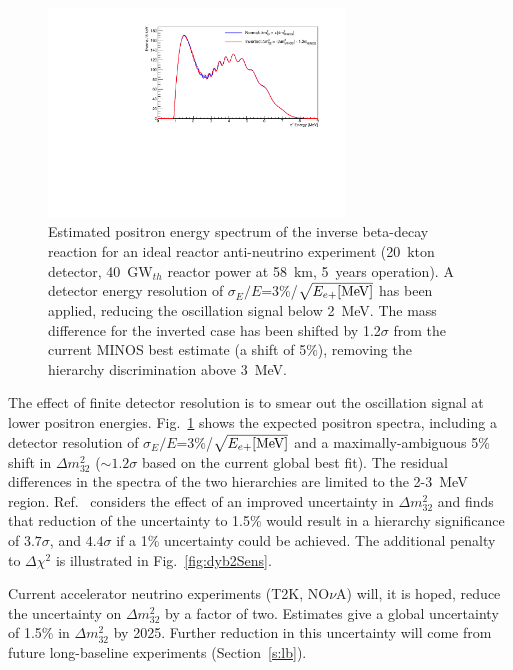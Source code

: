 \begin{figure}[htb]
\centering
\includegraphics[width=0.7\textwidth]{DAD/positronSpectrumWithResolution_deltaMSq32.pdf}
\caption{Estimated positron energy spectrum of the inverse beta-decay reaction 
  for an ideal reactor anti-neutrino experiment (20~kton
  detector, 40~GW$_{th}$ reactor power at 58~km, 5~years operation).
  A detector energy resolution of
  $\sigma_{E}/E$=3\%/$\sqrt{E_{e+}{\rm [MeV]}}$ has been applied,
  reducing the oscillation signal below 2~MeV.  The mass difference
  for the inverted case has been shifted by 1.2$\sigma$ from the current MINOS
  best estimate (a shift of 5\%), removing the hierarchy discrimination above 3~MeV.
 }
\label{fig:reactorDet_WithDegeneracy}
\vspace{-0.3cm}
\end{figure}

The effect of finite detector resolution is to 
smear out the oscillation signal at lower positron energies.
Fig.~\ref{fig:reactorDet_WithDegeneracy} shows the expected positron
spectra, including
a detector resolution of $\sigma_{E}/E$=3\%/$\sqrt{E_{e+}{\rm [MeV]}}$ and a maximally-ambiguous 5\% shift in ${\Delta}m^2_{32}$ ($\sim 1.2\sigma$ based on the current global best fit).  The residual differences in the spectra of the
two hierarchies are limited to the 2-3~MeV region.  
Ref.~\cite{liyf_dyb2_2013} considers the effect of an improved uncertainty in ${\Delta}m^{2}_{32}$ and finds that reduction of the uncertainty to 1.5\% would result in a hierarchy significance of $3.7\sigma$, and $4.4\sigma$ if a 1\% uncertainty could be achieved.  The additional penalty to $\Delta \chi^2$ is illustrated in Fig.~\ref{fig:dyb2Sens}.


Current accelerator neutrino
experiments (T2K, NO$\nu$A) will, it is hoped, reduce the uncertainty on ${\Delta}m^{2}_{32}$ by
a factor of two.   Estimates give a global uncertainty of
1.5\% in ${\Delta}m^{2}_{32}$ by 2025.  Further reduction in this uncertainty will come from future long-baseline experiments (Section~\ref{s:lb}).



